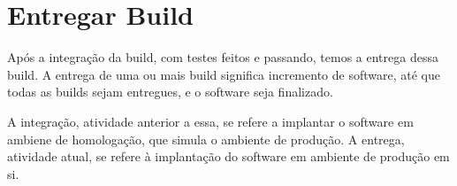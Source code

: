 \chapter{Entregar Build}
\label{sec:entregar}

Após a integração da build, com testes feitos e passando, temos a entrega dessa build. A entrega de uma ou mais build significa incremento de software, até que todas as builds sejam entregues, e o software seja finalizado.

A integração, atividade anterior a essa, se refere a implantar o software em ambiene de homologação, que simula o ambiente de produção. A entrega, atividade atual, se refere à implantação do software em ambiente de produção em si.
